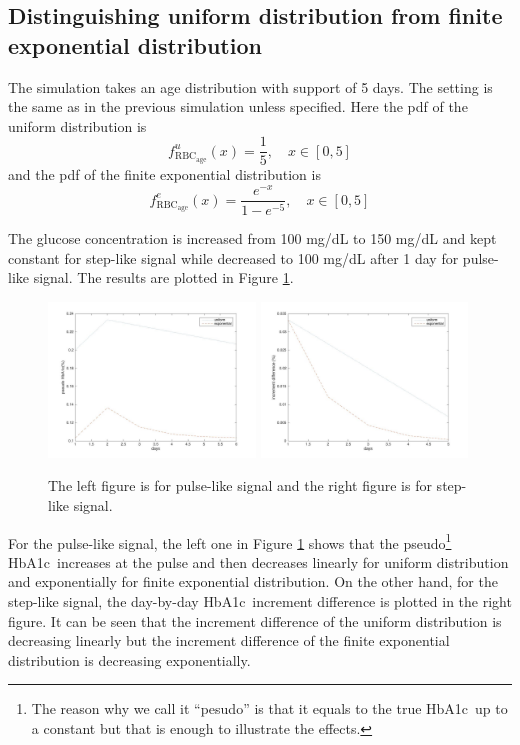 \documentclass{article}
\newcommand{\hba}{\textrm{HbA1c}}
\newcommand{\f}{f_{\mathrm{RBC}_{\mathrm{age}}}}
\begin{document}
\subsection{Distinguishing uniform distribution from finite exponential distribution}
The simulation takes an age distribution with support of 5 days. The setting is the same as in the previous simulation unless specified. Here the pdf of the uniform distribution is 
\[\f^{u}(x) = \frac{1}{5}, \quad x\in[0,5]\]
and the pdf of the finite exponential distribution is
\[\f^{e}(x) = \frac{e^{-x}}{1-e^{-5}}, \quad x\in[0,5]\]

The glucose concentration is increased from 100 mg/dL to 150 mg/dL and kept constant for step-like signal while decreased to 100 mg/dL after 1 day for pulse-like signal. The results are plotted in Figure \ref{fig2}. 

\begin{figure}[h]
  \centering
  \includegraphics[width=5.5cm]{fig/distinguish_uni_exp_pulse.jpg}
  \includegraphics[width=5.5cm]{fig/distinguish_uni_exp.jpg}
  \caption{The left figure is for pulse-like signal and the right figure is for step-like signal.}
  \label{fig2}
\end{figure}

For the pulse-like signal, the left one in Figure \ref{fig2} shows that the pseudo\footnote{The reason why we call it ``pesudo'' is that it equals to the true \hba\ up to a constant but that is enough to illustrate the effects.}  \hba\ increases at the pulse and then decreases linearly for uniform distribution and exponentially for finite exponential distribution. On the other hand, for the step-like signal, the day-by-day \hba\ increment difference is plotted in the right figure. It can be seen that the increment difference of the uniform distribution is decreasing linearly but the increment difference of the finite exponential distribution is decreasing exponentially.
\end{document}
